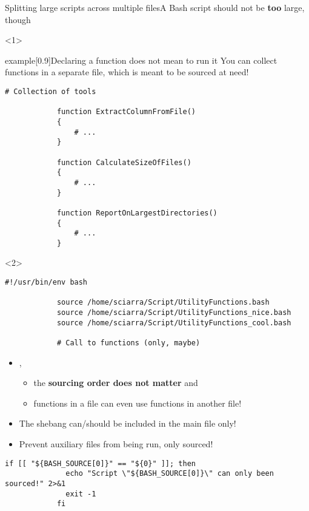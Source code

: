 \begin{frame}[fragile]{Splitting large scripts across multiple files}{A Bash script should not be \textbf{too} large, though}
    \vspace{-3mm}
    \begin{onlyenv}<1>
        \begin{varblock}{example}[0.9\textwidth]{Declaring a function does not mean to run it}
            You can collect functions in a separate file, which is meant to be sourced at need!
        \end{varblock}
        \begin{lstlisting}[style=MyBash, numbers=none]
            # Collection of tools

            function ExtractColumnFromFile()
            {
                # ...
            }

            function CalculateSizeOfFiles()
            {
                # ...
            }

            function ReportOnLargestDirectories()
            {
                # ...
            }
        \end{lstlisting}
    \end{onlyenv}
    \begin{onlyenv}<2>
        \begin{lstlisting}[style=MyBash, numbers=none, belowskip=-6mm]
            #!/usr/bin/env bash

            source /home/sciarra/Script/UtilityFunctions.bash
            source /home/sciarra/Script/UtilityFunctions_nice.bash
            source /home/sciarra/Script/UtilityFunctions_cool.bash

            # Call to functions (only, maybe)
        \end{lstlisting}
        \begin{itemize}
            \item {},
                  \begin{itemize}
                      \item the \textbf{sourcing order does not matter} and
                      \item functions in a file can even use functions in another file!
                  \end{itemize}
            \item The shebang can/should be included in the main file only!
            \item Prevent auxiliary files from being run, only sourced!
        \end{itemize}
        \begin{lstlisting}[style=MyBash, numbers=none, aboveskip=2mm, xleftmargin=1mm, xrightmargin=1mm]
            if [[ "${BASH_SOURCE[0]}" == "${0}" ]]; then
              echo "Script \"${BASH_SOURCE[0]}\" can only been sourced!" 2>&1
              exit -1
            fi
        \end{lstlisting}
    \end{onlyenv}
\end{frame}
